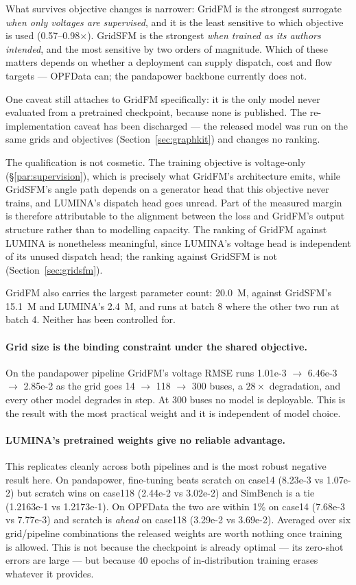 \documentclass[10pt]{article}
\begin{document}
What survives objective changes is narrower: GridFM is the strongest surrogate
\emph{when only voltages are supervised}, and it is the least sensitive to which
objective is used (0.57--0.98\(\times\)). GridSFM is the strongest \emph{when
trained as its authors intended}, and the most sensitive by two orders of
magnitude. Which of these matters depends on whether a deployment can supply
dispatch, cost and flow targets --- OPFData can; the pandapower backbone
currently does not.

One caveat still attaches to GridFM specifically: it is the only model never
evaluated from a pretrained checkpoint, because none is published. The
re-implementation caveat has been discharged --- the released model was run on
the same grids and objectives (Section~\ref{sec:graphkit}) and changes no
ranking.

The qualification is not cosmetic. The training objective is voltage-only
(\S\ref{par:supervision}), which is precisely what GridFM's architecture emits,
while GridSFM's angle path depends on a generator head that this objective never
trains, and LUMINA's dispatch head goes unread. Part of the measured margin is
therefore attributable to the alignment between the loss and GridFM's output
structure rather than to modelling capacity. The ranking of GridFM against
LUMINA is nonetheless meaningful, since LUMINA's voltage head is independent of
its unused dispatch head; the ranking against GridSFM is not
(Section~\ref{sec:gridsfm}).

GridFM also carries the largest parameter count: 20.0~M, against GridSFM's
15.1~M and LUMINA's 2.4~M, and runs at batch 8 where the other two run at batch
4. Neither has been controlled for.

\paragraph{Grid size is the binding constraint under the shared objective.} On the
pandapower pipeline GridFM's voltage RMSE runs 1.01e-3 \(\rightarrow\) 6.46e-3
\(\rightarrow\) 2.85e-2 as the grid goes 14 \(\rightarrow\) 118
\(\rightarrow\) 300 buses, a \(28\times\) degradation, and every other model
degrades in step. At 300 buses no model is deployable. This is the result with
the most practical weight and it is independent of model choice.

\paragraph{LUMINA's pretrained weights give no reliable advantage.} This
replicates cleanly across both pipelines and is the most robust negative result
here. On pandapower, fine-tuning beats scratch on case14 (8.23e-3 vs 1.07e-2)
but scratch wins on case118 (2.44e-2 vs 3.02e-2) and SimBench is a tie
(1.2163e-1 vs 1.2173e-1). On OPFData the two are within 1\% on case14 (7.68e-3
vs 7.77e-3) and scratch is \emph{ahead} on case118 (3.29e-2 vs 3.69e-2).
Averaged over six grid/pipeline combinations the released weights are worth
nothing once training is allowed. This is not because the checkpoint is already
optimal --- its zero-shot errors are large --- but because 40 epochs of
in-distribution training erases whatever it provides.
\end{document}
